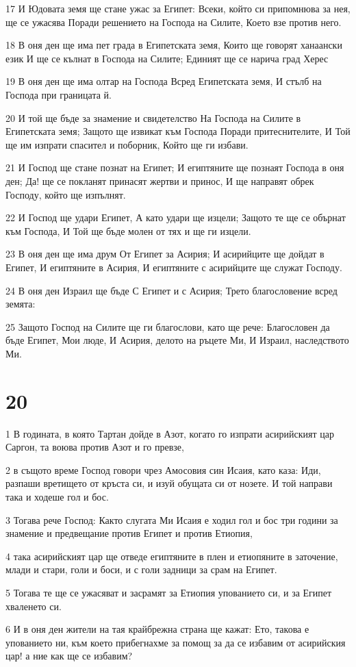 \par 17 И Юдовата земя ще стане ужас за Египет: Всеки, който си припомнюва за нея, ще се ужасява Поради решението на Господа на Силите, Което взе против него.
\par 18 В оня ден ще има пет града в Египетската земя, Които ще говорят ханаански език И ще се кълнат в Господа на Силите; Единият ще се нарича град Херес
\par 19 В оня ден ще има олтар на Господа Всред Египетската земя, И стълб на Господа при границата й.
\par 20 И той ще бъде за знамение и свидетелство На Господа на Силите в Египетската земя; Защото ще извикат към Господа Поради притеснителите, И Той ще им изпрати спасител и поборник, Който ще ги избави.
\par 21 И Господ ще стане познат на Египет; И египтяните ще познаят Господа в оня ден; Да! ще се покланят принасят жертви и принос, И ще направят обрек Господу, който ще изпълнят.
\par 22 И Господ ще удари Египет, А като удари ще изцели; Защото те ще се обърнат към Господа, И Той ще бъде молен от тях и ще ги изцели.
\par 23 В оня ден ще има друм От Египет за Асирия; И асирийците ще дойдат в Египет, И египтяните в Асирия, И египтяните с асирийците ще служат Господу.
\par 24 В оня ден Израил ще бъде С Египет и с Асирия; Трето благословение всред земята:
\par 25 Защото Господ на Силите ще ги благослови, като ще рече: Благословен да бъде Египет, Мои люде, И Асирия, делото на ръцете Ми, И Израил, наследството Ми.

\chapter{20}

\par 1 В годината, в която Тартан дойде в Азот, когато го изпрати асирийският цар Саргон, та воюва против Азот и го превзе,
\par 2 в същото време Господ говори чрез Амосовия син Исаия, като каза: Иди, разпаши вретището от кръста си, и изуй обущата си от нозете. И той направи така и ходеше гол и бос.
\par 3 Тогава рече Господ: Както слугата Ми Исаия е ходил гол и бос три години за знамение и предвещание против Египет и против Етиопия,
\par 4 така асирийският цар ще отведе египтяните в плен и етиопяните в заточение, млади и стари, голи и боси, и с голи задници за срам на Египет.
\par 5 Тогава те ще се ужасяват и засрамят за Етиопия упованието си, и за Египет хваленето си.
\par 6 И в оня ден жители на тая крайбрежна страна ще кажат: Ето, такова е упованието ни, към което прибегнахме за помощ за да се избавим от асирийския цар! а ние как ще се избавим?

